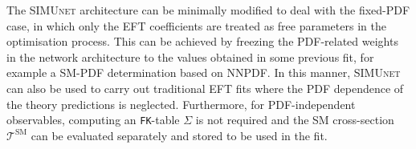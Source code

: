 \documentclass[withindex,glossary]{cam-thesis}
\newcommand{\simunet}{\textsc{SIMUnet}}
\begin{document}
%
The \simunet{} architecture can be minimally modified
to deal with the fixed-PDF case, in which only the EFT coefficients
are treated as free parameters in the optimisation process.
%
This can be achieved by freezing the PDF-related weights in the network
architecture to the values obtained in some previous fit, for example a SM-PDF
determination based on NNPDF.
%
In this manner, \simunet{} can also be used to carry out traditional EFT fits where the
PDF dependence of the theory predictions is neglected.
%
Furthermore,
for PDF-independent observables, computing an {\tt FK}-table $\Sigma$ is not required
and the SM cross-section $\mathcal{T}^\text{SM}$ can be evaluated separately
and stored to be used in the fit.
%

\end{document}
